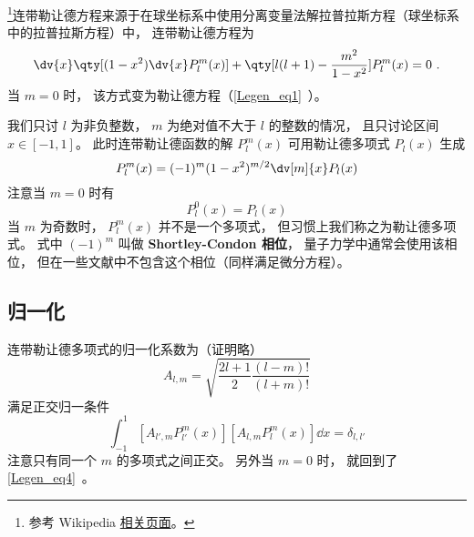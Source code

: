 

\footnote{参考 Wikipedia \href{https://en.wikipedia.org/wiki/Associated_Legendre_polynomials}{相关页面}。}连带勒让德方程来源于在球坐标系中使用分离变量法解拉普拉斯方程（球坐标系中的拉普拉斯方程）中， 连带勒让德方程为
\begin{equation}
\dv{x} \qty[(1-x^2)\dv{x} P_l^m(x)] + \qty[l(l+1) - \frac{m^2}{1-x^2}]P_l^m(x) = 0~.
\end{equation}
当 $m = 0$ 时， 该方式变为勒让德方程（\autoref{Legen_eq1}~）。

我们只讨 $l$ 为非负整数， $m$ 为绝对值不大于 $l$ 的整数的情况， 且只讨论区间 $x\in [-1,1]$。 此时连带勒让德函数的解 $P_l^m(x)$ 可用勒让德多项式 $P_l(x)$ 生成
\begin{equation}\label{AsLgdr_eq1}
P_l^m(x) = (-1)^m (1 - x^2)^{m/2} \dv[m]{x} P_l(x)
\end{equation}
注意当 $m = 0$ 时有
\begin{equation}
P_l^0(x) = P_l(x)
\end{equation}
当 $m$ 为奇数时， $P_l^m(x)$ 并不是一个多项式， 但习惯上我们称之为勒让德多项式。 式中 $(-1)^m$ 叫做 \textbf{Shortley-Condon 相位}， 量子力学中通常会使用该相位， 但在一些文献中不包含这个相位（同样满足微分方程）。

\subsection{归一化}
连带勒让德多项式的归一化系数为（证明略）
\begin{equation}\label{AsLgdr_eq3}
A_{l,m} = \sqrt{\frac{2l+1}{2}\frac{(l-m)!}{(l+m)!}}
\end{equation}
满足正交归一条件
\begin{equation}\label{AsLgdr_eq4}
\int_{-1}^1 [A_{l',m} P_{l'}^{m}(x)] [A_{l,m} P_l^{m}(x)] \dd{x} = \delta_{l,l'}
\end{equation}
注意只有同一个 $m$ 的多项式之间正交。 另外当 $m = 0$ 时， 就回到了\autoref{Legen_eq4}~。


